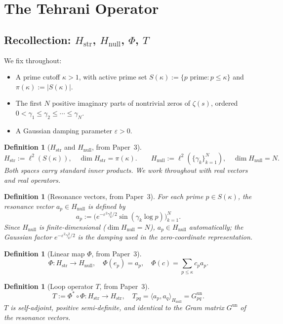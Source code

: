 \documentclass[11pt]{article}
\newtheorem{definition}[theorem]{Definition}
\newcommand{\Hstr}{H_{\mathrm{str}}}
\newcommand{\Hnull}{H_{\mathrm{null}}}
\newcommand{\Gun}{G^{\mathrm{un}}}
\begin{document}
\section{The Tehrani Operator}

\subsection{Recollection: $\Hstr$, $\Hnull$, $\Phi$, $T$}

We fix throughout:
\begin{itemize}
\item A prime cutoff $\kappa > 1$, with active prime set
  $S(\kappa) := \{p\text{ prime}: p\leq\kappa\}$
  and $\pi(\kappa) := |S(\kappa)|$.
\item The first $N$ positive imaginary parts of nontrivial zeros of
  $\zeta(s)$, ordered $0 < \gamma_1 \leq \gamma_2 \leq \cdots \leq \gamma_N$.
\item A Gaussian damping parameter $\varepsilon > 0$.
\end{itemize}

\begin{definition}[$\Hstr$ and $\Hnull$, from Paper~3]
\[
\Hstr := \ell^2(S(\kappa)),\quad \dim\Hstr = \pi(\kappa).
\qquad
\Hnull := \ell^2(\{\gamma_k\}_{k=1}^N),\quad \dim\Hnull = N.
\]
Both spaces carry standard inner products.
We work throughout with real vectors and real operators.
\end{definition}

\begin{definition}[Resonance vectors, from Paper~3]
For each prime $p\in S(\kappa)$, the \emph{resonance vector}
$a_p\in\Hnull$ is defined by
\[
a_p := \bigl(e^{-\varepsilon^2\gamma_k^2/2}\sin(\gamma_k\log p)\bigr)_{k=1}^N.
\]
Since $\Hnull$ is finite-dimensional ($\dim\Hnull=N$), $a_p\in\Hnull$
automatically; the Gaussian factor $e^{-\varepsilon^2\gamma_k^2/2}$ is
the damping used in the zero-coordinate representation.
\end{definition}

\begin{definition}[Linear map $\Phi$, from Paper~3]
\[
\Phi\colon\Hstr\to\Hnull,\quad
\Phi(e_p) = a_p,\quad
\Phi(c) = \sum_{p\leq\kappa}c_p a_p.
\]
\end{definition}

\begin{definition}[Loop operator $T$, from Paper~3]
\[
T := \Phi^*\circ\Phi\colon\Hstr\to\Hstr,\quad
T_{pq} = \langle a_p,a_q\rangle_{\Hnull} = G^{\mathrm{un}}_{pq}.
\]
$T$ is self-adjoint, positive semi-definite, and identical to the Gram
matrix $\Gun$ of the resonance vectors.
\end{definition}
\end{document}
